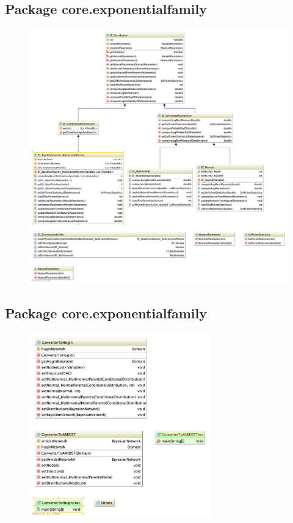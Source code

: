 \subsection{Package core.exponentialfamily}
\begin{figure}[H]
  \centering
    \includegraphics[width=\textwidth]{ClassDiagrams/core_exponentialfamily.jpg}
\end{figure}

\subsection{Package core.exponentialfamily}
\begin{figure}[H]
  \centering
    \includegraphics[width=0.7\textwidth]{ClassDiagrams/core_huginlink.jpg}
\end{figure}


